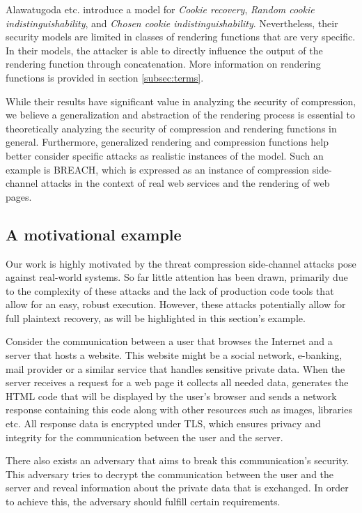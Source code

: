 \documentclass[conference, letterpaper, 10pt]{IEEEtran}
\begin{document}
Alawatugoda etc. \cite{c6} introduce a model for \textit{Cookie recovery},
\textit{Random cookie indistinguishability}, and \textit{Chosen cookie indistinguishability}.
Nevertheless, their security models are limited in classes of rendering functions
that are very specific. In their models, the attacker is able to directly influence
the output of the rendering function through concatenation. More information on
rendering functions is provided in section \ref{subsec:terms}.

While their results
have significant value in analyzing the security of compression, we believe
a generalization and abstraction of the rendering process is essential to
theoretically analyzing the security of compression and rendering functions in
general. Furthermore, generalized rendering and compression functions help
better consider specific attacks as realistic instances of the model. Such an
example is BREACH, which is expressed as an instance of compression side-channel
attacks in the context of real web services and the rendering of web pages.

\subsection{A motivational example}\label{subsec:example}
Our work is highly motivated by the threat compression side-channel attacks pose
against real-world systems. So far little attention has been drawn, primarily
due to the complexity of these attacks and the lack of production code tools
that allow for an easy, robust execution. However, these attacks potentially allow for full
plaintext recovery, as will be highlighted in this section's example.

Consider the communication between a user that browses the Internet and a server
that hosts a website. This website might be a social network, e-banking,
mail provider or a similar service that handles sensitive private data. When the server receives a request for a web page
it collects all needed data, generates the HTML code that will be
displayed by the user's browser and sends a network response containing this
code along with other resources such as images, libraries etc. All response data
is encrypted under TLS, which ensures privacy and integrity for the
communication between the user and the server.

There also exists an adversary that aims to break this communication's security.
This adversary tries to decrypt the communication between
the user and the server and reveal information about the private data that is
exchanged. In order to achieve this, the adversary should fulfill certain
requirements.
\end{document}
